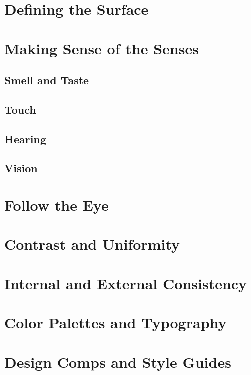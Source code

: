 \section{Defining the Surface}
\section{Making Sense of the Senses}
\subsection{Smell and Taste}
\subsection{Touch}
\subsection{Hearing}
\subsection{Vision}
\section{Follow the Eye}
\section{Contrast and Uniformity}
\section{Internal and External Consistency}
\section{Color Palettes and Typography}
\section{Design Comps and Style Guides}
